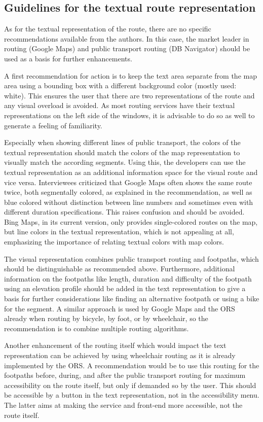 \documentclass[agile, final]{copernicus-agile}
\begin{document}
\subsection{Guidelines for the textual route representation}

As for the textual representation of the route, there are no specific recommendations available from the authors. In this case, the market leader in routing (Google Maps) and public transport routing (DB Navigator) should be used as a basis for further enhancements.

A first recommendation for action is to keep the text area separate from the map area using a bounding box with a different background color (mostly used: white). This ensures the user that there are two representations of the route and any visual overload is avoided. As most routing services have their textual representations on the left side of the windows, it is advisable to do so as well to generate a feeling of familiarity. 

Especially when showing different lines of public transport, the colors of the textual representation should match the colors of the map representation to visually match the according segments. Using this, the developers can use the textual representation as an additional information space for the visual route and vice versa. Interviewees criticized that Google Maps often shows the same route twice, both segmentally colored, as explained in the recommendation, as well as blue colored without distinction between line numbers and sometimes even with different duration specifications. This raises confusion and should be avoided. Bing Maps, in its current version, only provides single-colored routes on the map, but line colors in the textual representation, which is not appealing at all, emphasizing the importance of relating textual colors with map colors. 

The visual representation combines public transport routing and footpaths, which should be distinguishable as recommended above. Furthermore, additional information on the footpaths like length, duration and difficulty of the footpath using an elevation profile should be added in the text representation to give a basis for further considerations like finding an alternative footpath or using a bike for the segment. A similar approach is used by Google Maps and the ORS already when routing by bicycle, by foot, or by wheelchair, so the recommendation is to combine multiple routing algorithms. 

Another enhancement of the routing itself which would impact the text representation can be achieved by using wheelchair routing as it is already implemented by the ORS. A recommendation would be to use this routing for the footpaths before, during, and after the public transport routing for maximum accessibility on the route itself, but only if demanded so by the user. This should be accessible by a button in the text representation, not in the accessibility menu. The latter aims at making the service and front-end more accessible, not the route itself.
\end{document}
